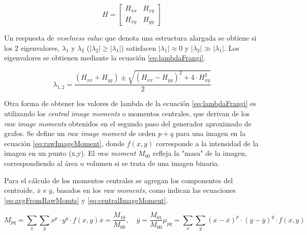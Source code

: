 \begin{equation}
    \label{eq:HessianMat}
    H = \begin{bmatrix}
        H_{xx} & H_{xy} \\
        H_{xy} & H_{yy} 
        \end{bmatrix}
\end{equation}

Un respuesta de {\it veselness value} que denota una estructura alargada se obtiene si los 2 eigenvalores, $\lambda_1$ y $\lambda_2$ ($|\lambda_2| \geq |\lambda_1|$) satisfacen $|\lambda_1| \approx 0 $ y $|\lambda_2| \gg |\lambda_1|$. Los eigenvalores se obtienen mediante la ecuaci\'on \ref{eq:lambdaFrangi}.

\begin{equation}
    \label{eq:lambdaFrangi}
    \lambda_{1,2} = \dfrac{(H_{xx} + H_{yy}) \pm \sqrt{(H_{xx} - H_{yy})^{2} + 4\cdot H_{xy}^{2}     } }{2}
\end{equation}

Otra forma de obtener los valores de lambda de la ecuaci\'on \ref{eq:lambdaFrangi} es utilizando los {\it central image moments} o momentos centrales, que derivan de los {\it raw image moments} obtenidos en el segundo paso del generador aproximado de grafos. Se define un {\it raw image moment} de orden $p+q$ para una imagen en la ecuaci\'on \eqref{eq:rawImageMoment}, donde $f(x,y)$ corresponde a la intensidad de la imagen en un punto (x,y). El {\it raw moment} $M_{00}$ refleja la "masa" de la imagen, correspondiendo al \'area o volumen si se trata de una imagen binaria. 

Para el c\'alculo de los momentos centrales se agregan los componentes del centroide, $\overline{x}$ e $\overline{y}$, basados en los {\it raw moments}, como indican las ecuaciones \eqref{eq:avgFromRawMomts} y \eqref{eq:centralImageMoment}.

\begin{subequations}
\begin{equation}
    \label{eq:rawImageMoment}
    M_{pq} = \sum\limits_{x} \sum\limits_{y} x^p \cdot y^q \cdot f(x,y)
\end{equation}
\begin{equation}
    \label{eq:avgFromRawMomts}
    \overline{x} = \frac{M_{10}}{M_{00}}, \quad
    \overline{y} = \frac{M_{01}}{M_{00}}
\end{equation}
\begin{equation}
    \label{eq:centralImageMoment}
    \mu_{pq} = \sum\limits_{x} \sum\limits_{y} (x - \overline{x})^{p} \cdot (y - \overline{y})^{q} \cdot f(x,y)
\end{equation}
\end{subequations}

